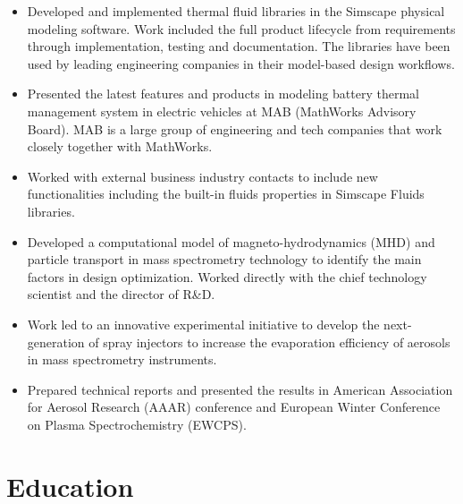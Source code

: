 \documentclass[11pt,a4paper,sans]{moderncv}
\begin{document}
{ \begin{itemize} \itemsep -1pt
  \item Developed and implemented thermal fluid libraries in the Simscape physical modeling software. Work included the full product lifecycle from requirements through implementation, testing and documentation. The libraries have been used by leading engineering companies in their model-based design workflows. 
  \item Presented the latest features and products in modeling battery thermal management system in electric vehicles at MAB (MathWorks Advisory Board). MAB is a large group of engineering and tech companies that work closely together with MathWorks.
  \item Worked with external business industry contacts to include new functionalities including the built-in fluids properties in Simscape Fluids libraries.
\end{itemize} }

{ \begin{itemize} \itemsep -1pt
  \item Developed a computational model of magneto-hydrodynamics (MHD) and particle transport in mass spectrometry technology to identify the main factors in design optimization. Worked directly with the chief technology scientist and the director of R\&D.
  \item Work led to an innovative experimental initiative to develop the next-generation of spray injectors
to increase the evaporation efficiency of aerosols in mass spectrometry instruments.
  \item Prepared technical reports and presented the results in American Association for Aerosol Research (AAAR) conference and European Winter Conference on Plasma Spectrochemistry (EWCPS).
\end{itemize} }

\section{\textbf{Education}}


\end{document}
